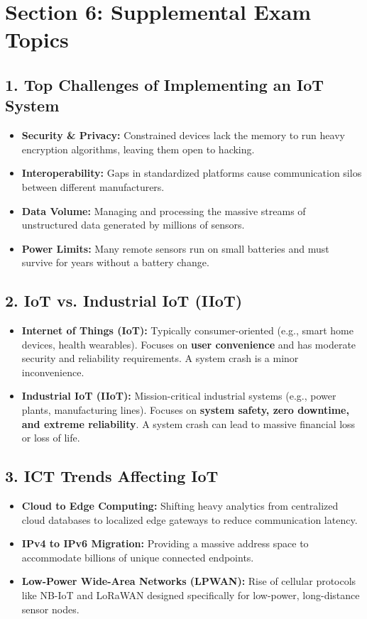 \section{Section 6: Supplemental Exam Topics}

\subsection{1. Top Challenges of Implementing an IoT System}
\begin{itemize}
  \item   \textbf{Security \& Privacy:} Constrained devices lack the memory to run heavy encryption algorithms, leaving them open to hacking.
  \item   \textbf{Interoperability:} Gaps in standardized platforms cause communication silos between different manufacturers.
  \item   \textbf{Data Volume:} Managing and processing the massive streams of unstructured data generated by millions of sensors.
  \item   \textbf{Power Limits:} Many remote sensors run on small batteries and must survive for years without a battery change.
\end{itemize}

\subsection{2. IoT vs. Industrial IoT (IIoT)}
\begin{itemize}
  \item   \textbf{Internet of Things (IoT):} Typically consumer-oriented (e.g., smart home devices, health wearables). Focuses on \textbf{user convenience} and has moderate security and reliability requirements. A system crash is a minor inconvenience.
  \item   \textbf{Industrial IoT (IIoT):} Mission-critical industrial systems (e.g., power plants, manufacturing lines). Focuses on \textbf{system safety, zero downtime, and extreme reliability}. A system crash can lead to massive financial loss or loss of life.
\end{itemize}

\subsection{3. ICT Trends Affecting IoT}
\begin{itemize}
  \item   \textbf{Cloud to Edge Computing:} Shifting heavy analytics from centralized cloud databases to localized edge gateways to reduce communication latency.
  \item   \textbf{IPv4 to IPv6 Migration:} Providing a massive address space to accommodate billions of unique connected endpoints.
  \item   \textbf{Low-Power Wide-Area Networks (LPWAN):} Rise of cellular protocols like NB-IoT and LoRaWAN designed specifically for low-power, long-distance sensor nodes.
\end{itemize}


